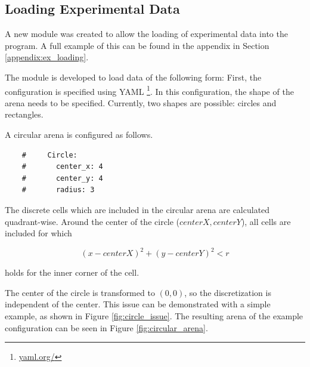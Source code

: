 \subsection{Loading Experimental Data}
A new module was created to allow the loading of experimental data into the program.
A full example of this can be found in the appendix in Section \ref{appendix:ex_loading}.

The module is developed to load data of the following form:
First, the configuration is specified using YAML \footnote{\url{yaml.org/}}.
In this configuration, the shape of the arena needs to be specified. Currently, two shapes are possible: circles and rectangles.

A circular arena is configured as follows.

\begin{verbatim}
	#     Circle:
	#       center_x: 4
	#       center_y: 4
	#       radius: 3
\end{verbatim}

The discrete cells which are included in the circular arena are calculated quadrant-wise. Around the center of the circle ($centerX, centerY$), all cells are included for which

\[
(x - centerX)^2 + (y - centerY)^2 < r
\]

\noindent
holds for the inner corner of the cell.

The center of the circle is transformed to $(0,0)$, so the discretization is independent of the center. This issue can be demonstrated with a simple example, as shown in Figure \ref{fig:circle_issue}. The resulting arena of the example configuration can be seen in Figure \ref{fig:circular_arena}.

